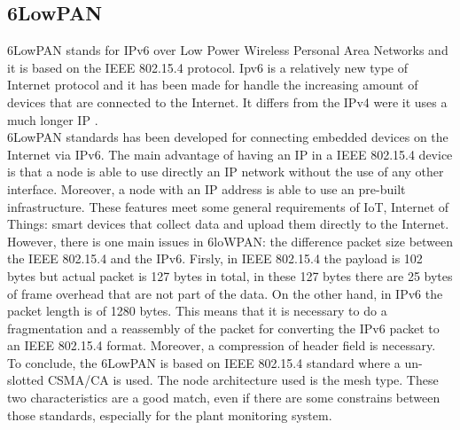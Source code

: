 \subsection{6LowPAN}
6LowPAN stands for IPv6 over Low Power Wireless Personal Area Networks and it is based on the IEEE 802.15.4 protocol. Ipv6 is a relatively new type of Internet protocol and it has been made for handle the increasing amount of devices that are connected to the Internet. It differs from the IPv4 were it uses a much longer IP \cite{6lowpan}.\\
6LowPAN standards has been developed for connecting embedded devices on the Internet via IPv6.\cite{why}
The main advantage of having an IP in a IEEE 802.15.4 device is that a node is able to use directly an IP network without the use of any other interface. Moreover, a node with an IP address is able to use an pre-built infrastructure. These features meet some general requirements of IoT, Internet of Things: smart devices that collect data and upload them directly to the Internet.
However, there is one main issues in 6loWPAN: the difference packet size between the IEEE 802.15.4 and the IPv6. Firsly, in IEEE 802.15.4 the payload is 102 bytes but actual packet is 127 bytes in total, in these 127 bytes there are 25 bytes of frame overhead that are not part of the data. On the other hand, in IPv6 the packet length is of 1280 bytes. This means that it is necessary to do a fragmentation and a reassembly of the packet for converting the IPv6 packet to an IEEE 802.15.4 format. Moreover, a compression of header field is necessary.\\
To conclude, the 6LowPAN is based on IEEE 802.15.4 standard where a un-slotted CSMA/CA is used. The node architecture used is the mesh type. These two characteristics are a good match, even if there are some constrains between those standards, especially for the plant monitoring system.